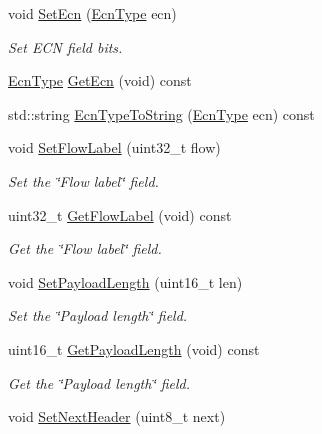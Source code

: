 \begin{DoxyCompactItemize}
\item 
void \hyperlink{classns3_1_1Ipv6Header_a1ca26106cee01e102b28ccd5a226cca7}{Set\+Ecn} (\hyperlink{classns3_1_1Ipv6Header_a8d6d294ba3232974841ebd721de29ace}{Ecn\+Type} ecn)
\begin{DoxyCompactList}\small\item\em Set E\+CN field bits. \end{DoxyCompactList}\item 
\hyperlink{classns3_1_1Ipv6Header_a8d6d294ba3232974841ebd721de29ace}{Ecn\+Type} \hyperlink{classns3_1_1Ipv6Header_aee4f659c31ee330232110d19257eff0d}{Get\+Ecn} (void) const 
\item 
std\+::string \hyperlink{classns3_1_1Ipv6Header_a4b8471354acad8618a0d6ea003fe4339}{Ecn\+Type\+To\+String} (\hyperlink{classns3_1_1Ipv6Header_a8d6d294ba3232974841ebd721de29ace}{Ecn\+Type} ecn) const 
\item 
void \hyperlink{classns3_1_1Ipv6Header_a82b99f796a0c5ee8bc0e3766b4356b61}{Set\+Flow\+Label} (uint32\+\_\+t flow)
\begin{DoxyCompactList}\small\item\em Set the \char`\"{}\+Flow label\char`\"{} field. \end{DoxyCompactList}\item 
uint32\+\_\+t \hyperlink{classns3_1_1Ipv6Header_ab86c3ee5c00743a5da516f90d48432e3}{Get\+Flow\+Label} (void) const 
\begin{DoxyCompactList}\small\item\em Get the \char`\"{}\+Flow label\char`\"{} field. \end{DoxyCompactList}\item 
void \hyperlink{classns3_1_1Ipv6Header_a6d888c3bc07b2f523c1f8512e976a25b}{Set\+Payload\+Length} (uint16\+\_\+t len)
\begin{DoxyCompactList}\small\item\em Set the \char`\"{}\+Payload length\char`\"{} field. \end{DoxyCompactList}\item 
uint16\+\_\+t \hyperlink{classns3_1_1Ipv6Header_abb0c6d5e8def6677627f171573992828}{Get\+Payload\+Length} (void) const 
\begin{DoxyCompactList}\small\item\em Get the \char`\"{}\+Payload length\char`\"{} field. \end{DoxyCompactList}\item 
void \hyperlink{classns3_1_1Ipv6Header_add71fca40c6bf671bcc1403557a0852d}{Set\+Next\+Header} (uint8\+\_\+t next)

\end{DoxyCompactItemize}
